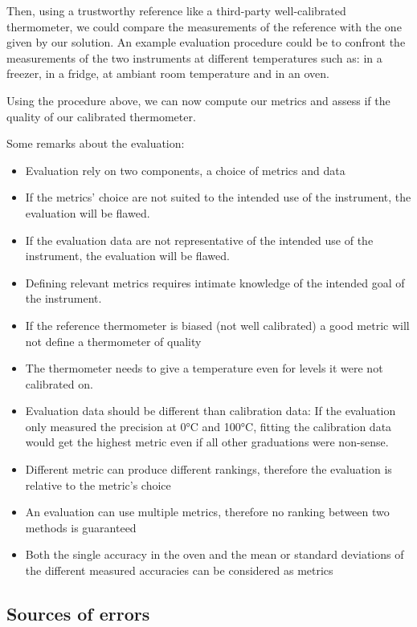\begin{bibunit}
Then, using a trustworthy reference like a third-party well-calibrated thermometer, we could compare the measurements of the reference with the one given by our solution.
  An example evaluation procedure could be to confront the measurements of the two instruments at different temperatures such as: in a freezer, in a fridge, at ambiant room temperature and in an oven.

Using the procedure above, we can now compute our metrics and assess if the quality of our calibrated thermometer.


Some remarks about the evaluation:
\begin{itemize}
\item Evaluation rely on two components, a choice of metrics and data
\item If the metrics' choice are not suited to the intended use of the instrument, the evaluation will be flawed.
\item If the evaluation data are not representative of the intended use of the instrument, the evaluation will be flawed.
\item Defining relevant metrics requires intimate knowledge of the intended goal of the instrument.
\item If the reference thermometer is biased (not well calibrated) a good metric will not define a thermometer of quality
\item The thermometer needs to give a temperature even for levels it were not calibrated on.
\item Evaluation data should be different than calibration data: If the evaluation only measured the precision at 0°C and 100°C, fitting the calibration data would get the highest metric even if all other graduations were non-sense.
\item Different metric can produce different rankings, therefore the evaluation is relative to the metric's choice
\item An evaluation can use multiple metrics, therefore no ranking between two methods is guaranteed
\item Both the single accuracy in the oven and the mean or standard deviations of the different measured accuracies can be considered as metrics
\end{itemize}

 \subsection{Sources of errors}


\end{bibunit}
